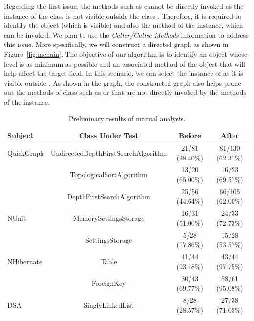 Regarding the first issue, the methods such as  cannot be directly invoked as the instance of the  class is not visible outside the class . Therefore, it is required to identify the object (which is visible) and also the method of the instance, which can be invoked. We plan to use the \emph{Caller/Callee Methods} information to address this issue. More specifically, we will construct a directed graph as shown in Figure~\ref{fig:mchain}. The objective of our algorithm is to identify an object whose level is as minimum as possible and an associated method of the object that will help affect the target field. In this scenario, we can select the instance of  as it is visible outside . As shown in the graph, the constructed graph also helps prune out the methods of  class such as  or  that are not directly invoked by the methods of the  instance.

\begin{table}[t]
\begin{SmallOut}
\begin{CodeOut}
\begin{center}
\centering \caption {\label{tab:results} Preliminary results of manual analysis.}
\begin {tabular} {|l|c|c|c|}
\hline
Subject & Class Under Test & Before & After\\
\hline
\hline QuickGraph & UndirectedDepthFirstSearchAlgorithm & 21/81 (28.40\%) & 81/130 (62.31\%)\\
\hline 						& TopologicalSortAlgorithm 						& 13/20 (65.00\%) & 16/23  (69.57\%)\\
\hline						&	DepthFirstSearchAlgorithm						& 25/56 (44.64\%) & 66/105 (62.00\%)\\
\hline NUnit		  & MemorySettingsStorage								& 16/31 (51.00\%) & 24/33  (72.73\%)\\
\hline						& SettingsStorage											& 5/28  (17.86\%) & 15/28  (53.57\%)\\
\hline NHibernate & Table																& 41/44 (93.18\%) & 43/44  (97.75\%)\\
\hline						& ForeignKey 													& 30/43 (69.77\%) & 58/61  (95.08\%)\\
\hline DSA			  & SinglyLinkedList									  & 8/28  (28.57\%) & 27/38  (71.05\%)\\
\hline
\end{tabular}
\end{center}
\end{CodeOut}
\end{SmallOut}\vspace*{-6ex}
\end{table}

